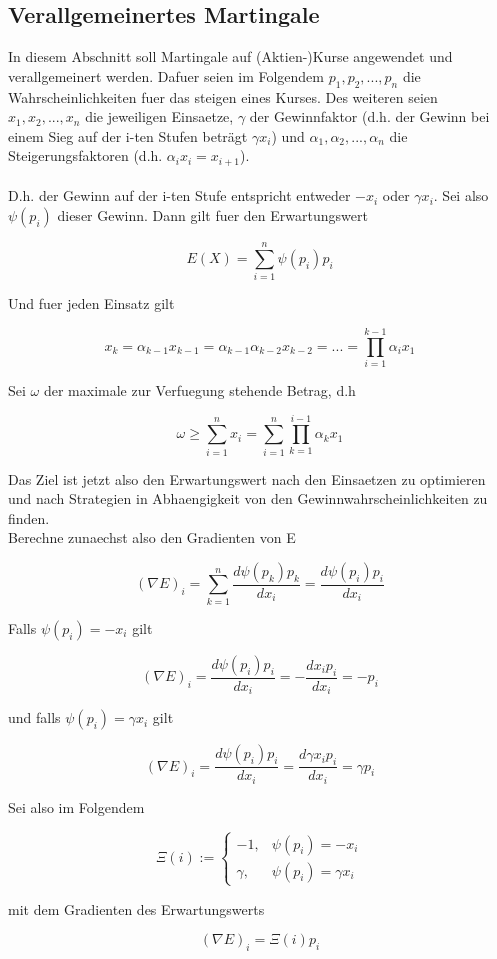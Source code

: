\documentclass[11pt]{scrartcl}
\begin{document}
		\subsection{Verallgemeinertes Martingale}
			In diesem Abschnitt soll Martingale auf (Aktien-)Kurse angewendet und verallgemeinert werden. Dafuer seien im Folgendem \(p_{1}, p_{2}, ...,p_{n}\) die Wahrscheinlichkeiten fuer das steigen eines Kurses. Des weiteren seien \(x_{1}, x_{2}, ...,x_{n}\) die jeweiligen Einsaetze, \(\gamma\) der Gewinnfaktor (d.h. der Gewinn bei einem Sieg auf der i-ten Stufen beträgt \(\gamma x_{i}\)) und \(\alpha_{1}, \alpha_{2}, ...,\alpha_{n}\) die Steigerungsfaktoren (d.h. \(\alpha_{i}x_{i}=x_{i+1}\)).\\\\
			D.h. der Gewinn auf der i-ten Stufe entspricht entweder \(-x_{i}\) oder \(\gamma x_{i}\). Sei also \(\psi(p_{i})\) dieser Gewinn. Dann gilt fuer den Erwartungswert
			\begin{center}
				\[E(X)=\sum_{i=1}^n \psi(p_{i})p_{i}\]
			\end{center}
			Und fuer jeden Einsatz gilt
			\begin{center}
				\[x_{k}=\alpha_{k-1}x_{k-1}=\alpha_{k-1}\alpha_{k-2}x_{k-2}=...=\prod_{i=1}^{k-1}\alpha_{i}x_{1}\]
			\end{center}
			Sei \(\omega\) der maximale zur Verfuegung stehende Betrag, d.h
			\begin{center}
				\[\omega \geq \sum_{i=1}^{n}x_{i}=\sum_{i=1}^{n}\prod_{k=1}^{i-1}\alpha_{k}x_{1}\]
			\end{center}
			Das Ziel ist jetzt also den Erwartungswert nach den Einsaetzen zu optimieren und nach Strategien in Abhaengigkeit von den Gewinnwahrscheinlichkeiten zu finden.\\
			Berechne zunaechst also den Gradienten von E
			\begin{center}
				\[(\nabla E)_{i}=\sum_{k=1}^{n}\frac{d\psi(p_{k})p_{k}}{dx_{i}}=\frac{d\psi(p_{i})p_{i}}{dx_{i}}\]
			\end{center}
			Falls \(\psi(p_{i})=-x_{i}\) gilt
			\begin{center}
				\[(\nabla E)_{i}=\frac{d\psi(p_{i})p_{i}}{dx_{i}}=-\frac{dx_{i}p_{i}}{dx_{i}}=-p_{i}\]
			\end{center}
			und falls \(\psi(p_{i})=\gamma x_{i}\) gilt
			\begin{center}
				\[(\nabla E)_{i}=\frac{d\psi(p_{i})p_{i}}{dx_{i}}=\frac{d\gamma x_{i}p_{i}}{dx_{i}}=\gamma p_{i}\]
			\end{center}
			Sei also im Folgendem
			\begin{center}
				\[ \Xi(i) :=
					\begin{cases}
						-1, & \psi(p_{i})=-x_{i} \\
						\gamma, & \psi(p_{i})=\gamma x_{i}
					\end{cases}
				\]
			\end{center}
			mit dem Gradienten des Erwartungswerts
			\begin{center}
				\[(\nabla E)_{i}=\Xi(i)p_{i}\]
			\end{center}
\end{document}
